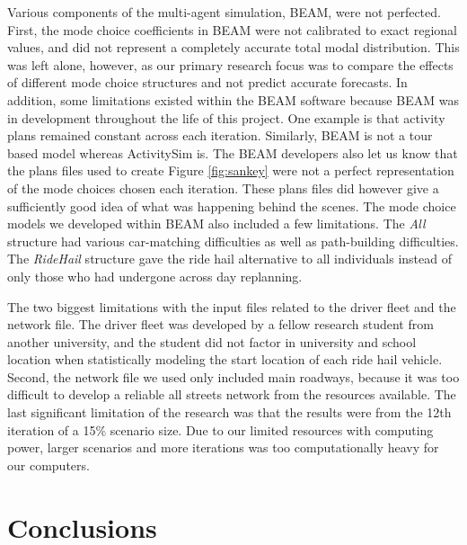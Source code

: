 \documentclass[fancy, masters]{byuthesis}
\begin{document}
Various components of the multi-agent simulation, BEAM, were not perfected. First, the mode choice coefficients in BEAM were not calibrated to exact regional values, and did not represent a completely accurate total modal distribution. This was left alone, however, as our primary research focus was to compare the effects of different mode choice structures and not predict accurate forecasts. In addition, some limitations existed within the BEAM software because BEAM was in development throughout the life of this project. One example is that activity plans remained constant across each iteration. Similarly, BEAM is not a tour based model whereas ActivitySim is. The BEAM developers also let us know that the plans files used to create Figure \ref{fig:sankey} were not a perfect representation of the mode choices chosen each iteration. These plans files did however give a sufficiently good idea of what was happening behind the scenes. The mode choice models we developed within BEAM also included a few limitations. The \emph{All} structure had various car-matching difficulties as well as path-building difficulties. The \emph{RideHail} structure gave the ride hail alternative to all individuals instead of only those who had undergone across day replanning.

The two biggest limitations with the input files related to the driver fleet and the network file. The driver fleet was developed by a fellow research student from another university, and the student did not factor in university and school location when statistically modeling the start location of each ride hail vehicle. Second, the network file we used only included main roadways, because it was too difficult to develop a reliable all streets network from the resources available. The last significant limitation of the research was that the results were from the 12th iteration of a 15\% scenario size. Due to our limited resources with computing power, larger scenarios and more iterations was too computationally heavy for our computers.

\hypertarget{conclusions}{%
\chapter{Conclusions}\label{conclusions}}
\end{document}
